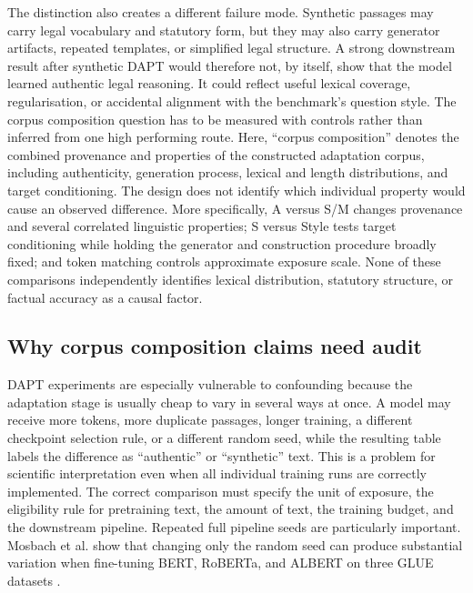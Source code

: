 \documentclass[pdflatex,sn-basic]{sn-jnl}
\begin{document}
The distinction also creates a different failure mode. Synthetic passages may
carry legal vocabulary and statutory form, but they may also carry generator
artifacts, repeated templates, or simplified legal structure. A strong
downstream result after synthetic DAPT would therefore not, by itself, show that
the model learned authentic legal reasoning. It could reflect useful lexical
coverage, regularisation, or accidental alignment with the benchmark's question
style. The corpus composition question has to be measured with controls rather
than inferred from one high performing route. Here, ``corpus composition''
denotes the combined provenance and properties of the constructed adaptation
corpus, including authenticity, generation process, lexical and length
distributions, and target conditioning. The design does not identify which
individual property would cause an observed difference.
More specifically, A versus S/M changes provenance and several correlated
linguistic properties; S versus Style tests target conditioning while holding
the generator and construction procedure broadly fixed; and token matching
controls approximate exposure scale. None of these comparisons independently
identifies lexical distribution, statutory structure, or factual accuracy as a
causal factor.

\subsection{Why corpus composition claims need audit}

DAPT experiments are especially vulnerable to confounding because the adaptation
stage is usually cheap to vary in several ways at once. A model may receive more
tokens, more duplicate passages, longer training, a different checkpoint
selection rule, or a different random seed, while the resulting table labels the
difference as ``authentic'' or ``synthetic'' text. This is a problem for
scientific interpretation even when all individual training runs are correctly
implemented. The correct comparison must specify the unit of exposure, the
eligibility rule for pretraining text, the amount of text, the training budget,
and the downstream pipeline. Repeated full pipeline seeds are particularly
important. Mosbach et al. show that changing only the random seed can produce
substantial variation when fine-tuning BERT, RoBERTa, and ALBERT on three GLUE
datasets \citep{mosbachStabilityBERT2021}.
\end{document}

